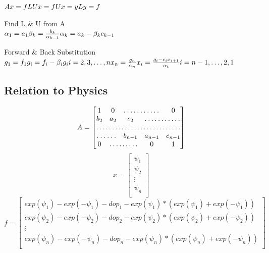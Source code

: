 \documentclass[12pt]{article}
\begin{document}
\begin{math}
Ax=f \\
LUx=f \\
Ux=y \\
Ly=f \\
\end{math}

Find L \& U from A \\
\begin{math}
\alpha_{1}=a_{1} \\
\beta_{k}=\frac{b_{k}}{\alpha_{k-1}} \\
\alpha_{k}=a_{k}-\beta_{k}c_{k-1}
\end{math}

Forward \& Back Substitution \\
\begin{math}
g_{1}=f_{1} \\
g_{i}=f_{i}-\beta_{i}g_{i} \\
i = 2, 3, \dots, n \\ 
\\
x_{n}=\frac{g_{n}}{\alpha_{n}} \\
x_{i}=\frac{g_{i}-c_{i}x_{i+1}}{\alpha_{i}} \\
i = n-1, \dots, 2, 1
\end{math}

\subsection{Relation to Physics}
\[
A=
\begin{bmatrix}
    1 & 0 & \hdotsfor{2} & 0 \\
    b_{2} & a_{2} &  c_{2} & \hdotsfor{2}  \\
   \hdotsfor{5} \\
   \hdotsfor{2}  & b_{n-1} & a_{n-1} &  c_{n-1} \\
   0 & \hdotsfor{2}  & 0 & 1
\end{bmatrix}
\]
\[
x = 
\begin{bmatrix}
\psi_{1} \\
\psi_{2} \\
\vdots \\
\psi_{n} \\
\end{bmatrix}
\]
\[
f = 
\begin{bmatrix}
exp(\psi_{1})-exp(-\psi_{1})-dop_{1}-exp(\psi_{1})*(exp(\psi_{1})+exp(-\psi_{1})) \\
exp(\psi_{2})-exp(-\psi_{2})-dop_{2}-exp(\psi_{2})*(exp(\psi_{2})+exp(-\psi_{2})) \\
\vdots \\
exp(\psi_{n})-exp(-\psi_{n})-dop_{n}-exp(\psi_{n})*(exp(\psi_{n})+exp(-\psi_{n})) \\
\end{bmatrix}
\]
\end{document}
